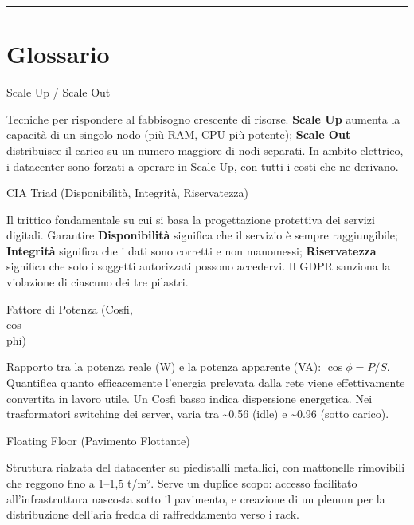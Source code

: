 \documentclass[
  italian,
  openany]{book}
\begin{document}
\begin{center}\rule{0.5\linewidth}{0.5pt}\end{center}

\section{Glossario}\label{glossario-1}

\begin{calloutdefinition}{Scale Up / Scale Out}

Tecniche per rispondere al fabbisogno crescente di risorse.
\textbf{Scale Up} aumenta la capacità di un singolo nodo (più RAM, CPU
più potente); \textbf{Scale Out} distribuisce il carico su un numero
maggiore di nodi separati. In ambito elettrico, i datacenter sono
forzati a operare in Scale Up, con tutti i costi che ne derivano.

\end{calloutdefinition}

\begin{calloutdefinition}{CIA Triad (Disponibilità, Integrità, Riservatezza)}

Il trittico fondamentale su cui si basa la progettazione protettiva dei
servizi digitali. Garantire \textbf{Disponibilità} significa che il
servizio è sempre raggiungibile; \textbf{Integrità} significa che i dati
sono corretti e non manomessi; \textbf{Riservatezza} significa che solo
i soggetti autorizzati possono accedervi. Il GDPR sanziona la violazione
di ciascuno dei tre pilastri.

\end{calloutdefinition}

\begin{calloutdefinition}{Fattore di Potenza (Cosfi, \\cos\\phi)}

Rapporto tra la potenza reale (W) e la potenza apparente (VA):
\(\cos\phi = P / S\). Quantifica quanto efficacemente l'energia
prelevata dalla rete viene effettivamente convertita in lavoro utile. Un
Cosfi basso indica dispersione energetica. Nei trasformatori switching
dei server, varia tra \textasciitilde0.56 (idle) e \textasciitilde0.96
(sotto carico).

\end{calloutdefinition}

\begin{calloutdefinition}{Floating Floor (Pavimento Flottante)}

Struttura rialzata del datacenter su piedistalli metallici, con
mattonelle rimovibili che reggono fino a 1--1,5 t/m². Serve un duplice
scopo: accesso facilitato all'infrastruttura nascosta sotto il
pavimento, e creazione di un plenum per la distribuzione dell'aria
fredda di raffreddamento verso i rack.

\end{calloutdefinition}
\end{document}
